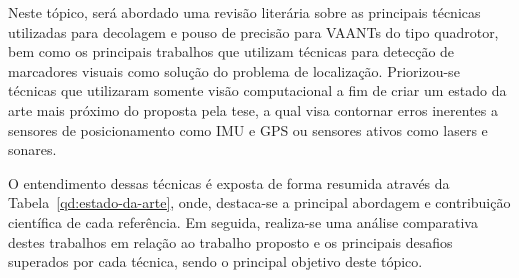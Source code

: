 


	
	Neste tópico, será abordado uma revisão literária sobre as principais técnicas utilizadas para decolagem e pouso de precisão para VAANTs do tipo quadrotor, bem como os principais trabalhos que utilizam técnicas para detecção de marcadores visuais como solução do problema de localização. Priorizou-se técnicas que utilizaram somente visão computacional a fim de criar um estado da arte mais próximo do proposta pela tese, a qual visa contornar erros inerentes a sensores de posicionamento como IMU e GPS ou sensores ativos como lasers e sonares. 
	
	O entendimento dessas técnicas é exposta de forma resumida através da Tabela~\ref{qd:estado-da-arte}, onde, destaca-se a principal abordagem e contribuição científica de cada referência. Em seguida, realiza-se uma análise comparativa destes trabalhos em relação ao trabalho proposto e os principais desafios superados por cada técnica, sendo o principal objetivo deste tópico. 
	
